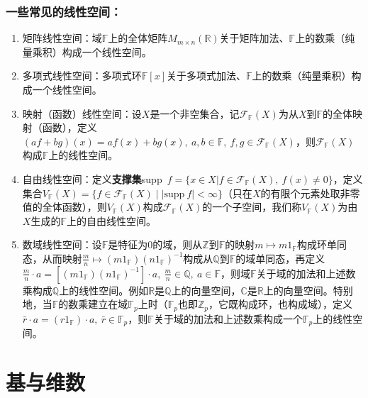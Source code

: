 \documentclass[zihao=5,UTF8]{report}
\theoremstyle{mystyle} %
\begin{document}
\subsubsection{一些常见的线性空间：}
\begin{enumerate}
    \item 矩阵线性空间：域$\mathbb{F}$上的全体矩阵$M_{m\times n}(\mathbb{R})$关于矩阵加法、$\mathbb{F}$上的数乘（纯量乘积）构成一个线性空间。
    \item 多项式线性空间：多项式环$\mathbb{F}[x]$关于多项式加法、$\mathbb{F}$上的数乘（纯量乘积）构成一个线性空间。
    \item 映射（函数）线性空间：设$X$是一个非空集合，记$\mathcal{F}_{\mathbb{F}}(X)$为从$X$到$\mathbb{F}$的全体映射（函数），定义$(af + bg)(x) = af(x)+bg(x),\ a,b\in \mathbb{F},\ f,g \in \mathcal{F}_{\mathbb{F}}(X)$，则$\mathcal{F}_{\mathbb{F}}(X)$构成$\mathbb{F}$上的线性空间。
    \item 自由线性空间：定义\textbf{支撑集}supp\ $f=\{x\in X| f \in \mathcal{F}_{\mathbb{F}}(X),\ f(x) \ne 0 \}$，定义集合$V_{\mathbb{F}}(X) = \{f \in \mathcal{F}_{\mathbb{F}}(X)\mid |\text{supp}\ f|< \infty\}$（只在$X$的有限个元素处取非零值的全体函数），则$V_{\mathbb{F}}(X)$构成$\mathcal{F}_{\mathbb{F}}(X)$的一个子空间，我们称$V_{\mathbb{F}}(X)$为由$X$生成的$\mathbb{F}$上的自由线性空间。
    \item 数域线性空间：设$\mathbb{F}$是特征为0的域，则从$\mathbb{Z}$到$\mathbb{F}$的映射$m\longmapsto m1_{\mathbb{F}}$构成环单同态，从而映射$\frac{m}{n}\longmapsto (m1_{\mathbb{F}})(n1_{\mathbb{F}})^{-1}$构成从$\mathbb{Q}$到$\mathbb{F}$的域单同态，再定义$\frac{m}{n}\cdot a =[(m1_{\mathbb{F}})(n1_{\mathbb{F}})^{-1}]\cdot a,\ \frac{m}{n}\in \mathbb{Q},\ a\in \mathbb{F} $，则域$\mathbb{F}$关于域的加法和上述数乘构成$\mathbb{Q}$上的线性空间。{\color{gray}\small 例如$\mathbb{R}$是$\mathbb{Q}$上的向量空间，$\mathbb{C}$是$\mathbb{R}$上的向量空间。}特别地，当$\mathbb{F}$的数乘建立在域$\mathbb{F}_p$上时（$\mathbb{F}_p$也即$\mathbb{Z}_p$，它既构成环，也构成域），定义$\bar{r}\cdot a = (r1_{\mathbb{F}})\cdot a,\ \bar{r}\in \mathbb{F}_p$，则$\mathbb{F}$关于域的加法和上述数乘构成一个$\mathbb{F}_p$上的线性空间。
\end{enumerate}


\section{基与维数}
\end{document}
